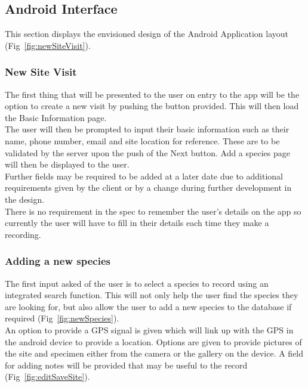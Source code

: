 \subsection{Android Interface}
    This section displays the envisioned design of the Android Application layout (Fig~\ref{fig:newSiteVisit}).

    \subsubsection{New Site Visit}
    
        The first thing that will be presented to the user on entry to the app will be the option to create a new visit by pushing the button provided. This will then load the Basic Information page.\\

        The user will then be prompted to input their basic information such as their name, phone number, email and site location for reference. These are to be validated by the server upon the push of the Next button. Add a species page will then be displayed to the user.\\
    
        Further fields may be required to be added at a later date due to additional requirements given by the client or by a change during further development in the design.\\
    
        There is no requirement in the spec to remember the user’s details on the app so currently the user will have to fill in their details each time they make a recording.\\
        
    \subsubsection{Adding a new species}
        
        The first input asked of the user is to select a species to record using an integrated search function. This will not only help the user find the species they are looking for, but also allow the user to add a new species to the database if required (Fig~\ref{fig:newSpecies}).\\
        
        An option to provide a GPS signal is given which will link up with the GPS in the android device to provide a location. Options are given to provide pictures of the site and specimen either from the camera or the gallery on the device. A field for adding notes will be provided that may be useful to the record (Fig~\ref{fig:editSaveSite}).\\
    
